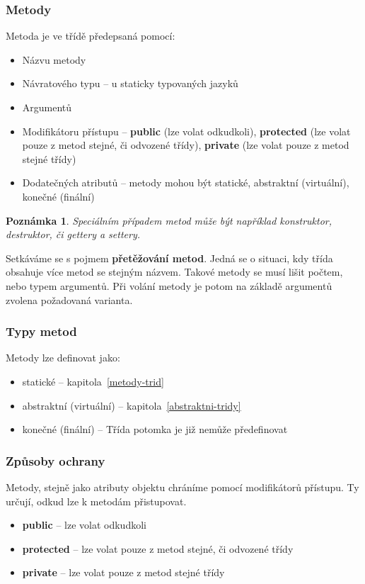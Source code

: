 \documentclass[10pt,a4paper]{article}
\newtheorem{note}{Poznámka}
\begin{document}
		\subsubsection{Metody}
			Metoda je ve třídě předepsaná pomocí:
			\begin{itemize}
				\item{Názvu metody}
				\item{Návratového typu -- u staticky typovaných jazyků}
				\item{Argumentů}
				\item{Modifikátoru přístupu -- \textbf{public} (lze volat odkudkoli), \textbf{protected} (lze volat pouze z metod stejné, či odvozené třídy), \textbf{private} (lze volat pouze z metod stejné třídy)}
				\item{Dodatečných atributů -- metody mohou být statické, abstraktní (virtuální), konečné (finální)}
			\end{itemize}

			\begin{note}
				Speciálním případem metod může být například konstruktor, destruktor, či gettery a settery.
			\end{note}

			Setkáváme se s pojmem \textbf{přetěžování metod}. Jedná se o situaci, kdy třída obsahuje více metod se stejným názvem. Takové metody se musí lišit počtem, nebo typem argumentů. Při volání metody je potom na základě argumentů zvolena požadovaná varianta.

		\subsubsection{Typy metod}
			Metody lze definovat jako:
				\begin{itemize}
					\item{statické -- kapitola~\ref{metody-trid}}
					\item{abstraktní (virtuální) -- kapitola~\ref{abstraktni-tridy}}
					\item{konečné (finální) -- Třída potomka je již nemůže předefinovat}
				\end{itemize}

		\subsubsection{Způsoby ochrany}
			Metody, stejně jako atributy objektu chráníme pomocí modifikátorů přístupu. Ty určují, odkud lze k metodám přistupovat.
			\begin{itemize}
				\item{\textbf{public} -- lze volat odkudkoli}
				\item{\textbf{protected} -- lze volat pouze z metod stejné, či odvozené třídy}
				\item{\textbf{private} -- lze volat pouze z metod stejné třídy}
			\end{itemize}
\end{document}
